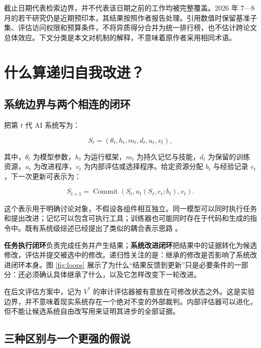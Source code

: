 \documentclass[11pt,,]{article}
\begin{document}
截止日期代表检索边界，并不代表该日期之前的工作均被完整覆盖。2026 年
7---8
月的若干研究仍是近期预印本，其结果按照作者报告处理。引用数值时保留基准子集、评估访问权限和预算条件，不将异质得分合并为统一排行榜，也不估计跨论文总体效应。下文分类是本文对机制的解释，不意味着原作者采用相同术语。

\hypertarget{ux4ec0ux4e48ux7b97ux9012ux5f52ux81eaux6211ux6539ux8fdb}{%
\section{什么算递归自我改进？}\label{ux4ec0ux4e48ux7b97ux9012ux5f52ux81eaux6211ux6539ux8fdb}}

\hypertarget{ux7cfbux7edfux8fb9ux754cux4e0eux4e24ux4e2aux76f8ux8fdeux7684ux95edux73af}{%
\subsection{系统边界与两个相连的闭环}\label{ux7cfbux7edfux8fb9ux754cux4e0eux4e24ux4e2aux76f8ux8fdeux7684ux95edux73af}}

把第 \(t\) 代 AI 系统写为：

\[
S_t=(\theta_t,h_t,m_t,d_t,u_t,v_t),
\]

其中，\(\theta_t\) 为模型参数，\(h_t\) 为运行框架，\(m_t\)
为持久记忆与技能，\(d_t\) 为保留的训练资源，\(u_t\) 为改进程序，\(v_t\)
为内部评估或选择程序。给定资源分配 \(b_t\) 与经验记录
\(e_t\)，下一次更新可表示为：

\[
S_{t+1}=\operatorname{Commit}\!\left(S_t,u_t(S_t,e_t;b_t),v_t\right).
\]

这个表示用于明确讨论对象，不假设各组件相互独立。同一模型可以同时执行任务和提出改进；记忆可以包含可执行工具；训练器也可能同时存在于代码和生成的指令中。既有系统级综述已经提出了类似的耦合表示思路
\citep{surveyren2026, surveyliu2026}。

\textbf{任务执行闭环}负责完成任务并产生结果；\textbf{系统改进闭环}把结果中的证据转化为候选修改，评估并提交被选中的修改。递归性关注的是：继承的修改是否影响了系统改进闭环本身。图
\ref{fig:loops}
展示了为什么``结果反馈到更新''只是必要条件的一部分：还必须确认具体继承了什么，以及它怎样改变下一轮改进。



在后文评估方案中，记为 \(V^*\)
的审计评估器被有意放在可修改状态之外。这是实验边界，并不意味着现实系统存在一个绝对不变的外部裁判。内部评估器可以进化，但不能让候选系统自由改写用来证明其进步的全部证据。

\hypertarget{ux4e09ux79cdux533aux522bux4e0eux4e00ux4e2aux66f4ux5f3aux7684ux5047ux8bf4}{%
\subsection{三种区别与一个更强的假说}\label{ux4e09ux79cdux533aux522bux4e0eux4e00ux4e2aux66f4ux5f3aux7684ux5047ux8bf4}}
\end{document}
